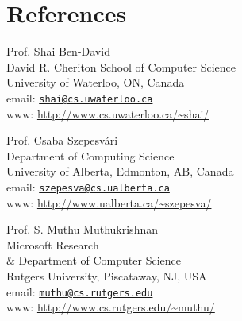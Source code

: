 \documentclass[9pt]{article}
\begin{document}
\section*{References}
%
\begin{minipage}[t]{9cm}
Prof. Shai Ben-David \\
David R. Cheriton School of Computer Science \\
University of Waterloo, ON, Canada \\
email: \href{mailto:shai@cs.uwaterloo.ca}{\texttt{shai@cs.uwaterloo.ca}} \\
www: \url{http://www.cs.uwaterloo.ca/~shai/}
\end{minipage}
%
\begin{minipage}[t]{9cm}
Prof. Csaba Szepesv\'ari \\
Department of Computing Science \\
University of Alberta, Edmonton, AB, Canada \\
email: \href{mailto:szepesva@cs.ualberta.ca}{\texttt{szepesva@cs.ualberta.ca}} \\
www: \url{http://www.ualberta.ca/~szepesva/}
\end{minipage}

\vspace{1cm}

\noindent
\begin{minipage}[t]{9cm}
Prof. S. Muthu Muthukrishnan \\
Microsoft Research \\
\& Department of Computer Science \\
Rutgers University, Piscataway, NJ, USA \\
email: \href{mailto:muthu@cs.rutgers.edu}{\texttt{muthu@cs.rutgers.edu}} \\
www: \url{http://www.cs.rutgers.edu/~muthu/}
\end{minipage}

\renewcommand{\refname}{Publications}
\nocite{*}


\end{document}
